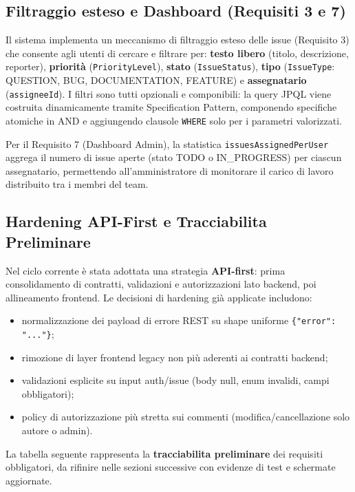 ﻿\documentclass[11pt,a4paper]{article}
\begin{document}
\subsection{Filtraggio esteso e Dashboard (Requisiti 3 e 7)}
Il sistema implementa un meccanismo di filtraggio esteso delle issue (Requisito 3) che consente agli utenti di cercare e filtrare per: \textbf{testo libero} (titolo, descrizione, reporter), \textbf{priorità} (\texttt{PriorityLevel}), \textbf{stato} (\texttt{IssueStatus}), \textbf{tipo} (\texttt{IssueType}: QUESTION, BUG, DOCUMENTATION, FEATURE) e \textbf{assegnatario} (\texttt{assigneeId}). I filtri sono tutti opzionali e componibili: la query JPQL viene costruita dinamicamente tramite Specification Pattern, componendo specifiche atomiche in AND e aggiungendo clausole \texttt{WHERE} solo per i parametri valorizzati.

Per il Requisito 7 (Dashboard Admin), la statistica \texttt{issuesAssignedPerUser} aggrega il numero di issue aperte (stato TODO o IN\_PROGRESS) per ciascun assegnatario, permettendo all'amministratore di monitorare il carico di lavoro distribuito tra i membri del team.

\subsection{Hardening API-First e Tracciabilita Preliminare}
Nel ciclo corrente è stata adottata una strategia \textbf{API-first}: prima consolidamento di contratti, validazioni e autorizzazioni lato backend, poi allineamento frontend. Le decisioni di hardening già applicate includono:
\begin{itemize}
    \item normalizzazione dei payload di errore REST su shape uniforme \texttt{\{"error": "..."\}};
    \item rimozione di layer frontend legacy non più aderenti ai contratti backend;
    \item validazioni esplicite su input auth/issue (body null, enum invalidi, campi obbligatori);
    \item policy di autorizzazione più stretta sui commenti (modifica/cancellazione solo autore o admin).
\end{itemize}

\noindent La tabella seguente rappresenta la \textbf{tracciabilita preliminare} dei requisiti obbligatori, da rifinire nelle sezioni successive con evidenze di test e schermate aggiornate.
\end{document}
